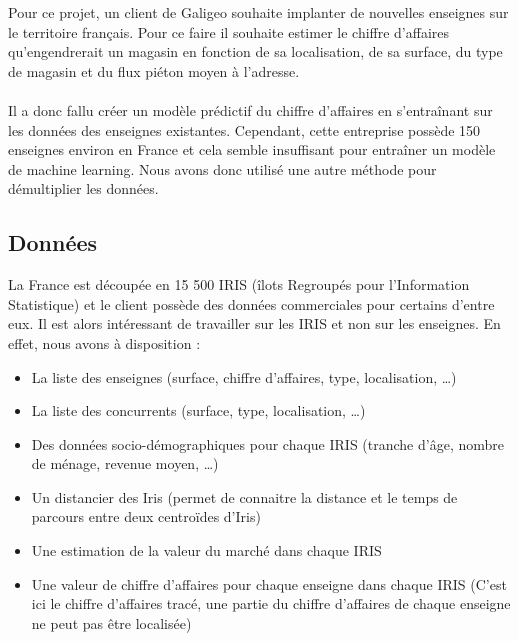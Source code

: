 Pour ce projet, un client de Galigeo souhaite implanter de nouvelles enseignes sur le territoire français. Pour ce faire il souhaite estimer le chiffre d’affaires qu’engendrerait un magasin en fonction de sa localisation, de sa surface, du type de magasin et du flux piéton moyen à l’adresse. 

\paragraph{}

Il a donc fallu créer un modèle prédictif du chiffre d’affaires en s’entraînant sur les données des enseignes existantes. Cependant, cette entreprise possède 150 enseignes environ en France et cela semble insuffisant pour entraîner un modèle de machine learning. Nous avons donc utilisé une autre méthode pour démultiplier les données.


\subsection{Données}

La France est découpée en 15 500 IRIS (îlots Regroupés pour l'Information Statistique) et le client possède des données commerciales pour certains d’entre eux. Il est alors intéressant de travailler sur les IRIS et non sur les enseignes. En effet, nous avons à disposition :

\begin{itemize}
    \item La liste des enseignes (surface, chiffre d’affaires, type, localisation, …)
    \item La liste des concurrents (surface, type, localisation, …)
    \item Des données socio-démographiques pour chaque IRIS (tranche d’âge, nombre de ménage, revenue moyen, …)
    \item Un distancier des Iris (permet de connaitre la distance et le temps de parcours entre deux centroïdes d’Iris)
    \item Une estimation de la valeur du marché dans chaque IRIS
    \item Une valeur de chiffre d’affaires pour chaque enseigne dans chaque IRIS (C’est ici le chiffre d’affaires tracé, une partie du chiffre d’affaires de chaque enseigne ne peut pas être localisée)
\end{itemize}

\paragraph{}

